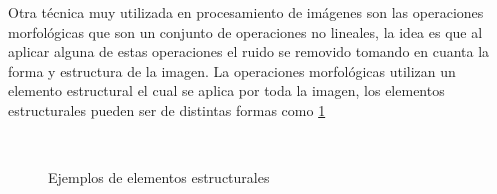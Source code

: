 Otra técnica muy utilizada en procesamiento de imágenes son las operaciones morfológicas que son un conjunto de operaciones no lineales, la idea es que al aplicar alguna de estas operaciones el ruido se removido tomando en cuanta la forma y estructura de la imagen. 
La operaciones morfológicas utilizan un elemento estructural el cual se aplica por toda la imagen, los elementos estructurales pueden ser de distintas formas como \ref{fig:EX}

\begin{figure}
\centering
{} %
\qquad
{} 
\\
\caption{Ejemplos de elementos estructurales} \label{fig:EX}
\end{figure} 

